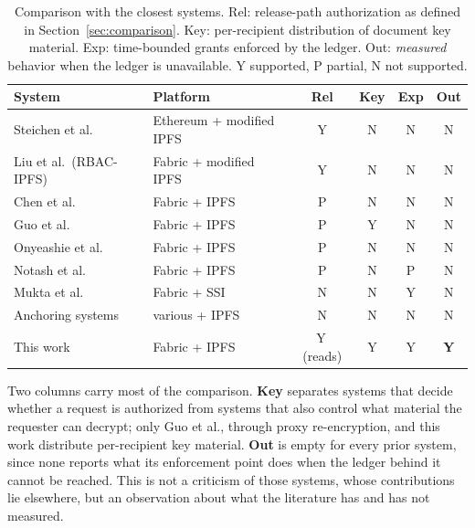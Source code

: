 \documentclass[preprint,12pt]{elsarticle}
\begin{document}
\begin{table}[!t]
\centering
\caption{Comparison with the closest systems. Rel: release-path authorization
as defined in Section~\ref{sec:comparison}. Key: per-recipient distribution of
document key material. Exp: time-bounded grants enforced by the ledger. Out:
\emph{measured} behavior when the ledger is unavailable. Y supported,
P partial, N not supported.}
\label{tab:related}
\footnotesize
\setlength{\tabcolsep}{4pt}
\begin{tabular}{@{}>{\raggedright\arraybackslash}p{}%
                 >{\raggedright\arraybackslash}p{}cccc@{}}
\toprule
System & Platform & Rel & Key & Exp & Out \\
\midrule
Steichen et al.~\cite{steichen2018blockchain} & Ethereum + modified IPFS
  & Y & N & N & N \\
Liu et al.\ (RBAC-IPFS)~\cite{liu2026rbacipfs} & Fabric + modified IPFS
  & Y & N & N & N \\
Chen et al.~\cite{chen2022filewallet} & Fabric + IPFS & P & N & N & N \\
Guo et al.~\cite{guo2024efficient} & Fabric + IPFS & P & Y & N & N \\
Onyeashie et al.~\cite{onyeashie2025fabricEvidence} & Fabric + IPFS
  & P & N & N & N \\
Notash et al.~\cite{notash2026adaptive} & Fabric + IPFS & P & N & P & N \\
Mukta et al.~\cite{mukta2026zerotrust} & Fabric + SSI & N & N & Y & N \\
Anchoring systems~\cite{liu2024blockchain,twoLevelBlockchain,verma2021nyaya,hanafi2021ipfschain,peelam2026decentralized}
  & various + IPFS & N & N & N & N \\
\midrule
This work & Fabric + IPFS & Y\,(reads) & Y & Y & \textbf{Y} \\
\bottomrule
\end{tabular}
\end{table}

Two columns carry most of the comparison. \textbf{Key} separates systems
that decide whether a request is authorized from systems that also control what
material the requester can decrypt; only Guo et al., through proxy
re-encryption, and this work distribute per-recipient key material.
\textbf{Out} is empty for every prior system, since none reports what its
enforcement point does when the ledger behind it cannot be reached. This is
not a criticism of those systems, whose contributions lie elsewhere, but an
observation about what the literature has and has not measured.
\end{document}

